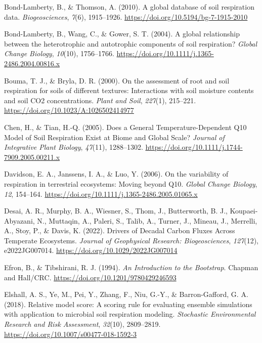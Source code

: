 \documentclass[
  letterpaper,
  DIV=11,
  numbers=noendperiod]{scrartcl}
\newlength{\cslhangindent}
\newenvironment{CSLReferences}[2] %
 {\begin{list}{}{%
  \setlength{\itemindent}{0pt}
  \setlength{\leftmargin}{0pt}
  \setlength{\parsep}{0pt}
  \ifodd #1
   \setlength{\leftmargin}{\cslhangindent}
   \setlength{\itemindent}{-1\cslhangindent}
  \fi
  \setlength{\itemsep}{#2\baselineskip}}}
 {\end{list}}
\begin{document}
\begin{CSLReferences}{1}{0}
Bond-Lamberty, B., \& Thomson, A. (2010). A global database of soil
respiration data. \emph{Biogeosciences}, \emph{7}(6), 1915--1926.
\url{https://doi.org/10.5194/bg-7-1915-2010}

Bond-Lamberty, B., Wang, C., \& Gower, S. T. (2004). A global
relationship between the heterotrophic and autotrophic components of
soil respiration? \emph{Global Change Biology}, \emph{10}(10),
1756--1766. \url{https://doi.org/10.1111/j.1365-2486.2004.00816.x}

Bouma, T. J., \& Bryla, D. R. (2000). On the assessment of root and soil
respiration for soils of different textures: Interactions with soil
moisture contents and soil {CO2} concentrations. \emph{Plant and Soil},
\emph{227}(1), 215--221. \url{https://doi.org/10.1023/A:1026502414977}

Chen, H., \& Tian, H.-Q. (2005). Does a {General Temperature-Dependent
Q10 Model} of {Soil Respiration Exist} at {Biome} and {Global Scale}?
\emph{Journal of Integrative Plant Biology}, \emph{47}(11), 1288--1302.
\url{https://doi.org/10.1111/j.1744-7909.2005.00211.x}

Davidson, E. A., Janssens, I. A., \& Luo, Y. (2006). On the variability
of respiration in terrestrial ecosystems: Moving beyond {Q10}.
\emph{Global Change Biology}, \emph{12}, 154--164.
\url{https://doi.org/10.1111/j.1365-2486.2005.01065.x}

Desai, A. R., Murphy, B. A., Wiesner, S., Thom, J., Butterworth, B. J.,
Koupaei-Abyazani, N., Muttaqin, A., Paleri, S., Talib, A., Turner, J.,
Mineau, J., Merrelli, A., Stoy, P., \& Davis, K. (2022). Drivers of
{Decadal Carbon Fluxes Across Temperate Ecosystems}. \emph{Journal of
Geophysical Research: Biogeosciences}, \emph{127}(12), e2022JG007014.
\url{https://doi.org/10.1029/2022JG007014}

Efron, B., \& Tibshirani, R. J. (1994). \emph{An {Introduction} to the
{Bootstrap}}. {Chapman and Hall/CRC}.
\url{https://doi.org/10.1201/9780429246593}

Elshall, A. S., Ye, M., Pei, Y., Zhang, F., Niu, G.-Y., \&
Barron-Gafford, G. A. (2018). Relative model score: A scoring rule for
evaluating ensemble simulations with application to microbial soil
respiration modeling. \emph{Stochastic Environmental Research and Risk
Assessment}, \emph{32}(10), 2809--2819.
\url{https://doi.org/10.1007/s00477-018-1592-3}


\end{CSLReferences}
\end{document}
